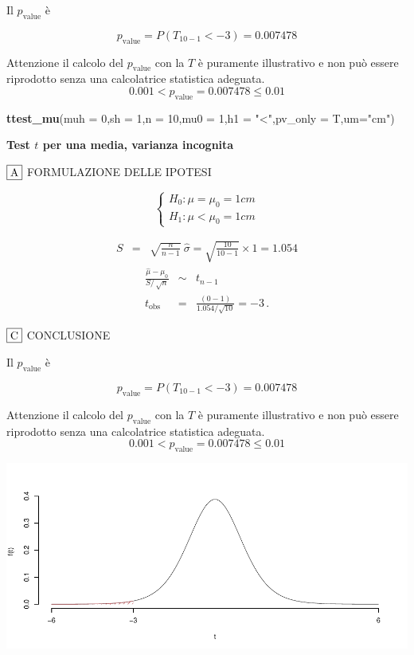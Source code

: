 \documentclass[
  11pt,
]{book}
\newenvironment{Shaded}{\begin{snugshade}}{\end{snugshade}}
\newcommand{\AttributeTok}[1]{\textcolor[rgb]{0.13,0.29,0.53}{#1}}
\newcommand{\DecValTok}[1]{\textcolor[rgb]{0.00,0.00,0.81}{#1}}
\newcommand{\FunctionTok}[1]{\textcolor[rgb]{0.13,0.29,0.53}{\textbf{#1}}}
\newcommand{\NormalTok}[1]{#1}
\newcommand{\StringTok}[1]{\textcolor[rgb]{0.31,0.60,0.02}{#1}}
\theoremstyle{mytheoremstyle}
\theoremstyle{mydefstyle}
\begin{document}
Il \(p_{\text{value}}\) è

\[ p_{\text{value}} = P(T_{10-1}<-3)=0.007478 \]

Attenzione il calcolo del \(p_\text{value}\) con la \(T\) è puramente illustrativo e non può essere riprodotto senza una calcolatrice statistica adeguata.\[
 0.001 < p_\text{value}= 0.007478 \leq 0.01 
\]

\begin{Shaded}
\begin{Highlighting}[]
\FunctionTok{ttest\_mu}\NormalTok{(}\AttributeTok{muh =} \DecValTok{0}\NormalTok{,}\AttributeTok{sh =} \DecValTok{1}\NormalTok{,}\AttributeTok{n =} \DecValTok{10}\NormalTok{,}\AttributeTok{mu0 =} \DecValTok{1}\NormalTok{,}\AttributeTok{h1 =} \StringTok{"\textless{}"}\NormalTok{,}\AttributeTok{pv\_only =}\NormalTok{ T,}\AttributeTok{um=}\StringTok{"cm"}\NormalTok{)}
\end{Highlighting}
\end{Shaded}

\textbf{Test \(t\) per una media, varianza incognita}

\(\fbox{A}\) FORMULAZIONE DELLE IPOTESI

\[\begin{cases}
   H_0: \mu = \mu_0=1cm \\
   H_1: \mu < \mu_0=1cm 
   \end{cases}\]

\begin{eqnarray*}
   S    &=& \sqrt{\frac{n} {n-1}}\ \widehat{\sigma} 
   =  \sqrt{\frac{ 10 } { 10 -1}} \times  1  =  1.054 
   \end{eqnarray*}
\begin{eqnarray*}
   \frac{\hat\mu - \mu_{0}} {S/\,\sqrt{n}}&\sim&t_{n-1}\\
   t_{\text{obs}}
   &=& \frac{ ( 0 -  1 )} { 1.054 /\sqrt{ 10 }}
   =   -3 \, .
   \end{eqnarray*}

\(\fbox{C}\) CONCLUSIONE

Il \(p_{\text{value}}\) è

\[ p_{\text{value}} = P(T_{10-1}<-3)=0.007478 \]

Attenzione il calcolo del \(p_\text{value}\) con la \(T\) è puramente illustrativo e non può essere riprodotto senza una calcolatrice statistica adeguata.\[
 0.001 < p_\text{value}= 0.007478 \leq 0.01 
\]

\begin{center}\includegraphics{Appunti_di_Statistica_2025_files/figure-latex/25-test-functions-10-6} \end{center}
\end{document}
